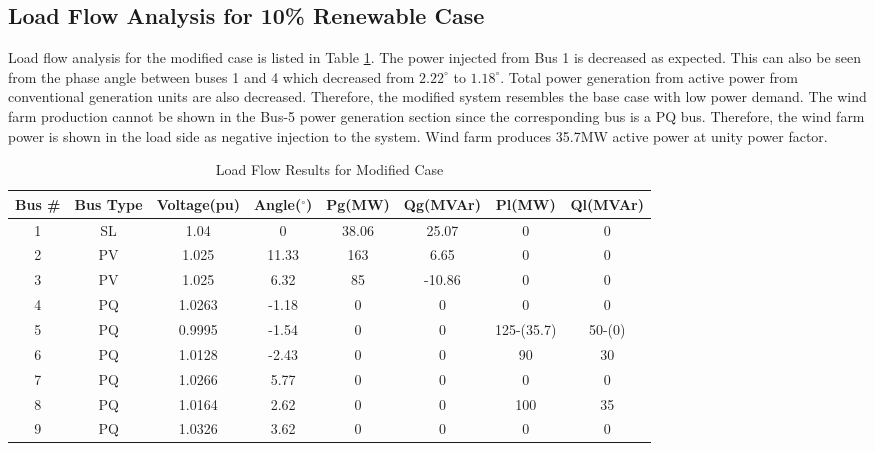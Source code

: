\subsection{Load Flow Analysis for 10\% Renewable Case}
Load flow analysis for the modified case is listed in Table \ref{loadflow_case2}. The power injected from Bus 1 is decreased as expected. This can also be seen from the phase angle between buses 1 and 4 which decreased from $2.22^{\circ}$ to $1.18^{\circ}$. Total power generation from active power from conventional generation units are also decreased. Therefore, the modified system resembles the base case with low power demand. The wind farm production cannot be shown in the Bus-5 power generation section since the corresponding bus is a PQ bus. Therefore, the wind farm power is shown in the load side as negative injection to the system. Wind farm produces 35.7MW active power at unity power factor. 
\begin{table}[h!]
	\centering
	\resizebox{\textwidth}{!}
	{
	\begin{tabular}{cclccccc}
		\hline
		Bus \# & Bus Type & \multicolumn{1}{c}{Voltage(pu)} & Angle($^{\circ}$)& Pg(MW)    & Qg(MVAr)     & Pl(MW)  & Ql(MVAr)   \\ \hline
		1      & SL       & \multicolumn{1}{c}{1.04}    & 0     & 38.06 & 25.07  & 0   & 0  \\
		2      & PV       & \multicolumn{1}{c}{1.025}   & 11.33 & 163   & 6.65   & 0   & 0  \\
		3      & PV       & \multicolumn{1}{c}{1.025}   & 6.32  & 85    & -10.86 & 0   & 0  \\
		4      & PQ       & \multicolumn{1}{c}{1.0263}  & -1.18 & 0     & 0      & 0   & 0  \\
		5      & PQ       & \multicolumn{1}{c}{0.9995}  & -1.54 & 0     & 0      & 125-(35.7) & 50-(0) \\
		6      & PQ       & \multicolumn{1}{c}{1.0128}  & -2.43 & 0     & 0      & 90  & 30 \\
		7      & PQ       & \multicolumn{1}{c}{1.0266}  & 5.77  & 0     & 0      & 0   & 0  \\
		8      & PQ       & \multicolumn{1}{c}{1.0164}  & 2.62  & 0     & 0      & 100 & 35 \\
		9      & PQ       & \multicolumn{1}{c}{1.0326}  & 3.62  & 0     & 0      & 0   & 0  \\ \hline
	\end{tabular}
	}
	\caption{Load Flow Results for Modified Case}
	\label{loadflow_case2}
\end{table}
